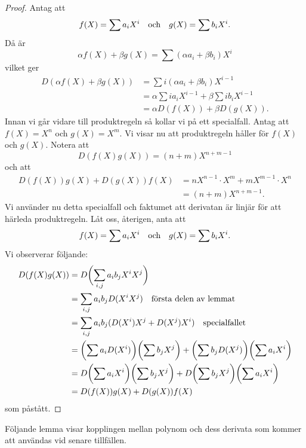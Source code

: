 \documentclass{article}
\theoremstyle{definition}
\begin{document}
\begin{proof}
  Antag att 
  \[f(X) = \sum a_iX^i \quad \textnormal{och} \quad g(X) = \sum b_iX^i.\]
  Då är 
  \[\alpha f(X) + \beta g(X) = \sum (\alpha a_i + \beta b_i)X^i\]
  vilket ger 
  \begin{align*}
    D(\alpha f(X) + \beta g(X)) &= \sum i(\alpha a_i + \beta b_i)X^{i-1} \\
    &= \alpha \sum ia_i X^{i-1} + \beta \sum ib_i X^{i-1} \\
    &= \alpha D(f(X)) + \beta D(g(X)).
  \end{align*}
  Innan vi går vidare till produktregeln så kollar vi på ett specialfall. Antag att $f(X) = X^n$ och $g(X) = X^m$. Vi visar nu att 
  produktregeln håller för $f(X)$ och $g(X)$. Notera att 
  \[D(f(X)g(X)) = (n+m)X^{n+m-1}\]
  och att 
  \begin{align*}
    D(f(X))g(X) + D(g(X)) f(X) &= nX^{n-1} \cdot X^m + mX^{m-1} \cdot X^n \\
    &= (n+m)X^{n+m-1}.
  \end{align*}
  Vi använder nu detta specialfall och faktumet att derivatan är linjär för att härleda produktregeln. 
  Låt oss, återigen, anta att
  \[f(X) = \sum a_iX^i \quad \textnormal{och} \quad g(X) = \sum b_iX^i. \]
  Vi observerar följande:
  \begin{align*}
    D(f(X)g(X)) &= D \biggl( \sum_{i, j} a_i b_j X^i X^j\biggr) \\
    &= \sum_{i, j} a_i b_j D(X^iX^j) \quad \textnormal{första delen av lemmat} \\
    &= \sum_{i, j} a_i b_j (D(X^i)X^j + D(X^j)X^i ) \quad \textnormal{specialfallet} \\
    &= \biggl (  \sum a_i D(X^i) \biggr) \biggl (  \sum b_jX^j \biggr) + \biggl ( \sum b_j D(X^j)  \biggr) \biggl ( \sum a_iX^i  \biggr) \\
    &= D \biggl (  \sum a_i X^i \biggr) \biggl (  \sum b_jX^j \biggr) + D \biggl ( \sum b_j X^j  \biggr) \biggl ( \sum a_iX^i  \biggr) \\
    &= D(f(X)) g(X) + D(g(X)) f(X)
  \end{align*}
  som påstått.
\end{proof}

Följande lemma visar kopplingen mellan polynom och dess derivata som kommer att användas vid senare tillfällen. 
\end{document}
